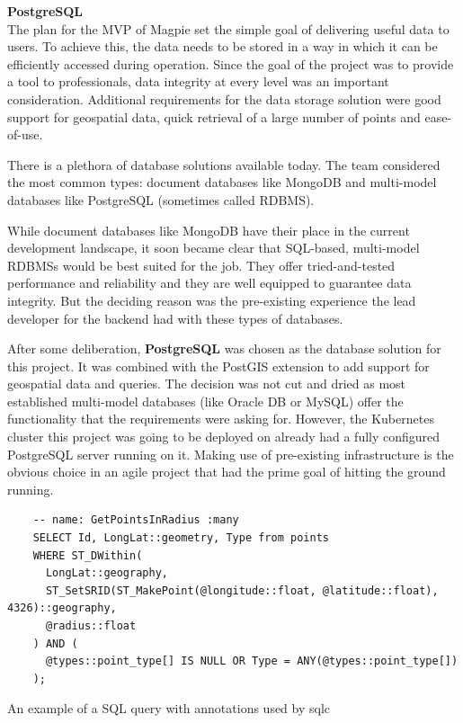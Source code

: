 \textbf{PostgreSQL}\\
The plan for the MVP of Magpie set the simple goal of delivering useful data to
users. To achieve this, the data needs to be stored in a way in which it can be
efficiently accessed during operation. Since the goal of the project was to
provide a tool to professionals, data integrity at every level was an important
consideration. Additional requirements for the data storage solution were good
support for geospatial data, quick retrieval of a large number of points and
ease-of-use.

There is a plethora of database solutions available today. The team considered
the most common types: document databases like MongoDB and multi-model databases
like PostgreSQL (sometimes called RDBMS).

While document databases like MongoDB have their place in the current
development landscape, it soon became clear that SQL-based, multi-model RDBMSs
would be best suited for the job. They offer tried-and-tested performance and
reliability and they are well equipped to guarantee data integrity. But the
deciding reason was the pre-existing experience the lead developer for the
backend had with these types of databases.

After some deliberation, \textbf{PostgreSQL} was chosen as the database solution
for this project. It was combined with the PostGIS extension to add support for
geospatial data and queries. The decision was not cut and dried as most
established multi-model databases (like Oracle DB or MySQL) offer the
functionality that the requirements were asking for. However, the Kubernetes
cluster this project was going to be deployed on already had a fully configured
PostgreSQL server running on it. Making use of pre-existing infrastructure is
the obvious choice in an agile project that had the prime goal of hitting the
ground running.

\begin{listing}[htbp]
  \centering{}
  \begin{minipage}{\textwidth}
  \begin{verbatim}
    -- name: GetPointsInRadius :many
    SELECT Id, LongLat::geometry, Type from points
    WHERE ST_DWithin(
      LongLat::geography,
      ST_SetSRID(ST_MakePoint(@longitude::float, @latitude::float), 4326)::geography,
      @radius::float
    ) AND (
      @types::point_type[] IS NULL OR Type = ANY(@types::point_type[])
    );
  \end{verbatim}
  \end{minipage}
  \caption{An example of a SQL query with annotations used by sqlc}
  \label{listing:sqlc_query_input}
\end{listing}

